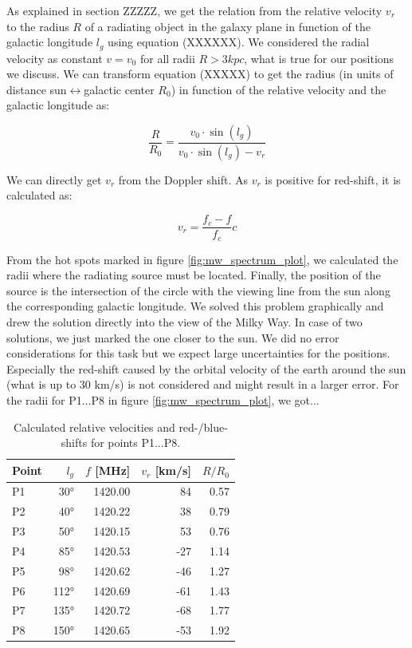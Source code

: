 As explained in section ZZZZZ, we get the relation from the relative velocity $v_r$ to the radius $R$ of a radiating object in the galaxy plane in function of the galactic longitude $l_g$ using equation (XXXXXX). We considered the radial velocity as constant $v = v_0$ for all radii $R > 3kpc$, what is true for our positions we discuss. We can transform equation (XXXXX) to get the radius (in units of distance sun$\leftrightarrow$galactic center $R_0$) in function of the relative velocity and the galactic longitude as:

\begin{equation}
	\frac{R}{R_0}=\frac{v_0\cdot \sin(l_g)}{v_0\cdot \sin(l_g)-v_r}
\end{equation}

We can directly get $v_r$ from the Doppler shift. As $v_r$ is positive for red-shift, it is calculated as:

\begin{equation}
	v_r = \frac{f_c-f}{f_c} c
\end{equation}

From the hot spots marked in figure \ref{fig:mw_spectrum_plot}, we calculated the radii where the radiating source must be located. Finally, the position of the source is the intersection of the circle with the viewing line from the sun along the corresponding galactic longitude. We solved this problem graphically and drew the solution directly into the view of the Milky Way. In case of two solutions, we just marked the one closer to the sun. We did no error considerations for this task but we expect large uncertainties for the positions. Especially the red-shift caused by the orbital velocity of the earth around the sun (what is up to 30 km/s) is not considered and might result in a larger error. For the radii for P1...P8 in figure \ref{fig:mw_spectrum_plot}, we got...

\begin{table}[H]
\centering \footnotesize
\begin{tabular}{l r  r  r  r }
    \toprule
    Point & $l_g$ & $f$ [MHz] & $v_r$ [km/s] & $R/R_0$\\
    \midrule
    P1    &  30°  & 1420.00   &  84          & 0.57 \\
    P2    &  40°  & 1420.22   &  38          & 0.79 \\
    P3    &  50°  & 1420.15   &  53          & 0.76 \\
    P4    &  85°  & 1420.53   & -27          & 1.14 \\
    P5    &  98°  & 1420.62   & -46          & 1.27 \\
    P6    & 112°  & 1420.69   & -61          & 1.43 \\
    P7    & 135°  & 1420.72   & -68          & 1.77 \\
    P8    & 150°  & 1420.65   & -53          & 1.92 \\
    \bottomrule
\end{tabular}
\caption{Calculated relative velocities and red-/blue-shifts for points P1...P8.}
\label{tab:hot_spots}
\end{table}

